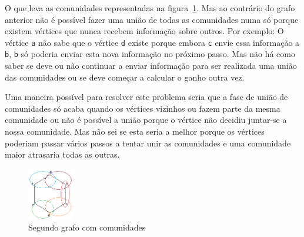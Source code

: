 \documentclass[a4paper,10pt]{report}
\begin{document}
O que leva as comunidades representadas na figura~\ref{fig:esb4}. Mas ao contrário do grafo anterior não é possível fazer uma união de todas as comunidades numa só porque existem vértices que nunca recebem informação sobre outros. Por exemplo: O vértice \texttt{a} não sabe que o vértice \texttt{d} existe porque embora \texttt{c} envie essa informação a \texttt{b}, \texttt{b} só poderia enviar esta nova informação no próximo passo. Mas não há como saber se deve ou não continuar a enviar informação para ser realizada uma união das comunidades ou se deve começar a calcular o ganho outra vez.

Uma maneira possível para resolver este problema seria que a fase de união de comunidades só acaba quando os vértices vizinhos ou fazem parte da mesma comunidade ou não é possível a união porque o vértice não decidiu juntar-se a nossa comunidade. Mas não sei se esta seria a melhor porque os vértices poderiam passar vários passos a tentar unir as comunidades e uma comunidade maior atrasaria todas as outras.

\begin{figure}
\includegraphics[width=20mm]{esboco4}
\caption{Segundo grafo com comunidades\label{fig:esb4}}
\end{figure}
\end{document}
